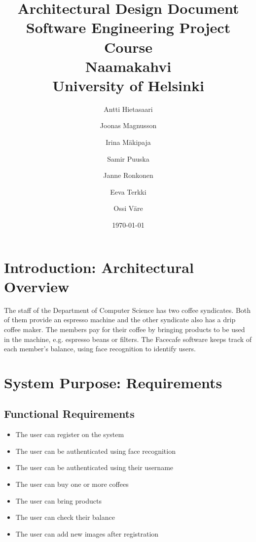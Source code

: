 \documentclass[11pt]{article}
\title{Architectural Design Document\\
  Software Engineering Project Course\\
  Naamakahvi\\
  University of Helsinki}
\author{Antti Hietasaari
  \and Joonas Magnusson
  \and Irina Mäkipaja
  \and Samir Puuska
  \and Janne Ronkonen
  \and Eeva Terkki
  \and Ossi Väre}
\date{\today}
\begin{document}
\maketitle

\tableofcontents



\section{Introduction: Architectural Overview}

The staff of the Department of Computer Science has two coffee syndicates. 
Both of them provide an espresso machine and the other syndicate also has 
a drip coffee maker. The members pay for their coffee by bringing products 
to be used in the machine, e.g. espresso beans or filters. The Facecafe 
software keeps track of each member’s balance, using face recognition to 
identify users.



\section{System Purpose: Requirements}

\subsection{Functional Requirements}

\begin{itemize}
\item{The user can register on the system}
\item{The user can be authenticated using face recognition}
\item{The user can be authenticated using their username}  
\item{The user can buy one or more coffees}
\item{The user can bring products}
\item{The user can check their balance}
\item{The user can add new images after registration}
\end{itemize}  
\end{document}
